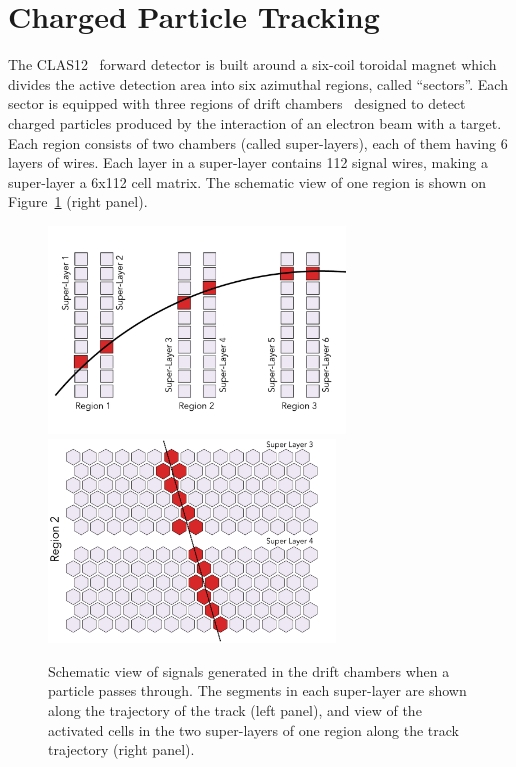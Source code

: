\section{Charged Particle Tracking}

The CLAS12~\cite{Burkert:2020akg} forward detector is built around a six-coil toroidal magnet which divides the active detection area into six azimuthal regions, called ``sectors''. Each sector is equipped with three regions of drift chambers~\cite{Mestayer:2020saf} designed to detect charged particles produced by the interaction of an electron beam with a target. Each region consists of two chambers (called super-layers), each of them having 6 layers of wires. Each layer  in a super-layer contains 112 signal wires, making a super-layer a 6x112 cell matrix. The schematic view of one region  is shown on Figure~\ref{dc:side_view} (right panel).

\begin{figure}[!ht]
\begin{center}
 \includegraphics[width=3.1in]{images/dc_diagram.pdf}
 \includegraphics[width=3in]{images/region_2_diagram.pdf}
\caption {Schematic view of signals generated in the drift chambers when a particle passes through. The segments in each super-layer are shown along the trajectory of the track (left panel), and view of the activated cells in the two super-layers of one region along the track trajectory (right panel).}
 \label{dc:side_view}
 \end{center}
\end{figure}

